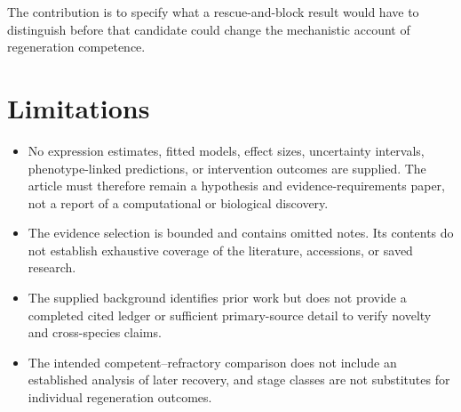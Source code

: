 \documentclass[11pt]{article}
\begin{document}
The contribution is to specify what a rescue-and-block result would have to distinguish before that candidate could change the mechanistic account of regeneration competence.

\section{Limitations}
\begin{itemize}
\item No expression estimates, fitted models, effect sizes, uncertainty intervals, phenotype-linked predictions, or intervention outcomes are supplied. The article must therefore remain a hypothesis and evidence-requirements paper, not a report of a computational or biological discovery.
\item The evidence selection is bounded and contains omitted notes. Its contents do not establish exhaustive coverage of the literature, accessions, or saved research.
\item The supplied background identifies prior work but does not provide a completed cited ledger or sufficient primary-source detail to verify novelty and cross-species claims.
\item The intended competent–refractory comparison does not include an established analysis of later recovery, and stage classes are not substitutes for individual regeneration outcomes.
\end{itemize}
\end{document}
